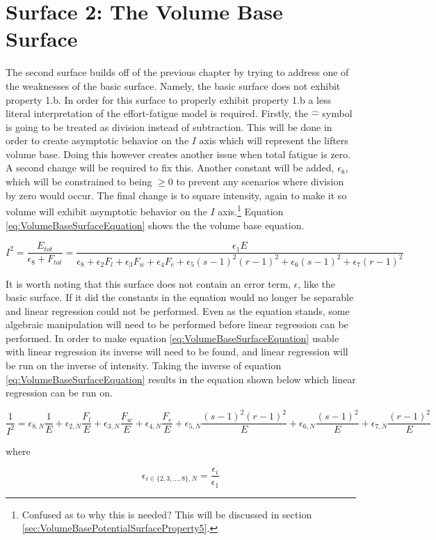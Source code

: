 \chapter{Surface 2: The Volume Base Surface}
\label{sec:PotentialSurfaceTheVolumeBaseSurface}

The second surface builds off of the previous chapter by trying to address one of the weaknesses of the basic surface. Namely, the basic surface does not exhibit property 1.b. In order for this surface to properly exhibit property 1.b a less literal interpretation of the effort-fatigue model is required. Firstly, the $\hat{-}$ symbol is going to be treated as division instead of subtraction. This will be done in order to create asymptotic behavior on the $I$ axis which will represent the lifters volume base. Doing this however creates another issue when total fatigue is zero. A second change will be required to fix this. Another constant will be added, $\epsilon_8$, which will be constrained to being $\ge 0$ to prevent any scenarios where division by zero would occur. The final change is to square intensity, again to make it so volume will exhibit asymptotic behavior on the $I$ axis.\footnote{Confused as to why this is needed? This will be discussed in section \ref{sec:VolumeBasePotentialSurfaceProperty5}.} Equation \ref{eq:VolumeBaseSurfaceEquation} shows the the volume base equation.
 
\begin{equation}
	I^2 = \frac{E_{tot}}{\epsilon_8+F_{tot}}= \frac{
		\epsilon_1E
	}{
		\epsilon_8+
		\epsilon_2 F_l+
		\epsilon_3 F_w+
		\epsilon_4 F_e+
		\epsilon_5 (s-1)^2(r-1)^2+
		\epsilon_6 (s-1)^2+
		\epsilon_7 (r-1)^2
	}
	\label{eq:VolumeBaseSurfaceEquation}
\end{equation}

It is worth noting that this surface does not contain an error term, $\epsilon$, like the basic surface. If it did the constants in the equation would no longer be separable and linear regression could not be performed. Even as the equation stands, some algebraic manipulation will need to be performed before linear regression can be performed. In order to make equation \ref{eq:VolumeBaseSurfaceEquation} usable with linear regression its inverse will need to be found, and linear regression will be run on the inverse of intensity. Taking the inverse of equation \ref{eq:VolumeBaseSurfaceEquation} results in the equation shown below which linear regression can be run on.

\begin{minipage}{\textwidth}
	\begin{equation*}
		\frac{1}{I^2}=
			\epsilon_{8,N}\frac{1}{E}+
			\epsilon_{2,N}\frac{F_l}{E}+
			\epsilon_{3,N}\frac{F_w}{E}+
			\epsilon_{4,N}\frac{F_e}{E}+
			\epsilon_{5,N}\frac{(s-1)^2(r-1)^2}{E}+
			\epsilon_{6,N}\frac{(s-1)^2}{E}+
			\epsilon_{7,N}\frac{(r-1)^2}{E}
	\end{equation*}
	\centerline{where}
		\begin{equation*}
			\epsilon_{i\in\{2,3,...,8\},N}=
			\frac{\epsilon_i}{\epsilon_1}
	\end{equation*}
\end{minipage}

